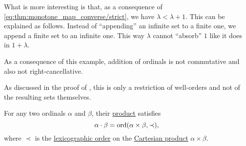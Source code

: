 \begin{example}
  What is more interesting is that, as a consequence of \eqref{eq:thm:monotone_map_converse/strict}, we have \( \lambda < \lambda + 1 \). This can be explained as follows. Instead of \enquote{appending} an infinite set to a finite one, we append a finite set to an infinite one. This way \( \lambda \) cannot \enquote{absorb} \( 1 \) like it does in \( 1 + \lambda \).

  As a consequence of this example, addition of ordinals is not commutative and also not right-cancellative.

  As discussed in the proof of , this is only a restriction of well-orders and not of the resulting sets themselves.
\end{example}

\begin{proposition}\label{thm:ordinal_multiplication_cartesian_product}
  For any two ordinals \( \alpha \) and \( \beta \), their \hyperref[def:ordinal_arithmetic/multiplication]{product} satisfies
  \begin{equation*}
    \alpha \cdot \beta = \operatorname{ord}(\alpha \times \beta, \prec),
  \end{equation*}
  where \( \prec \) is the \hyperref[def:lexicographic_order]{lexicographic order} on the \hyperref[def:cartesian_product]{Cartesian product} \( \alpha \times \beta \).
\end{proposition}
